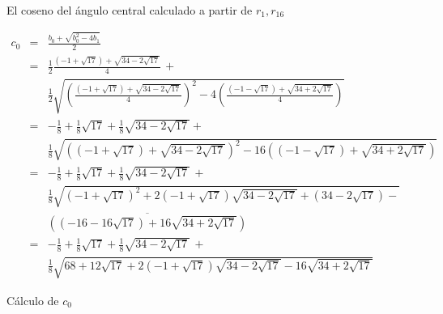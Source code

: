 \begin{figure}[b]
\begin{center}
\end{center}
\caption{El coseno del ángulo central calculado a partir de $r_1,r_{16}$}\label{f.hept-cosine}
\end{figure}

\begin{figure}[t]
\begin{eqnarray*}
c_0&=&\frac{b_0+\sqrt{b_0^2-4b_1}}{2}\\
&=&\frac{1}{2}
     \frac{
     (-1+\sqrt{17}) + 
     \sqrt{34-2\sqrt{17}}
   }{4}\,+ \\
&& 
    \frac{1}{2}
       \sqrt{\left(\frac{
     (-1+\sqrt{17}) + 
     \sqrt{34-2\sqrt{17}}
   }{4}\right)^2-4\left(\frac{
     (-1-\sqrt{17}) + 
     \sqrt{34+2\sqrt{17}}
   }{4}\right)}
   \\
&=&-\frac{1}{8}+\frac{1}{8}\sqrt{17} + 
     \frac{1}{8}\sqrt{34-2\sqrt{17}}
    + \\
   &&
     \frac{1}{8}\sqrt{
     \left(
     (-1+\sqrt{17}) + 
     \sqrt{34-2\sqrt{17}}
   \right)^2-16\left(
     (-1-\sqrt{17}) + 
     \sqrt{34+2\sqrt{17}}
   \right)}
\\
&=&-\frac{1}{8}+\frac{1}{8}\sqrt{17} + 
     \frac{1}{8}\sqrt{34-2\sqrt{17}}
   \, + \\
   &&
     \frac{1}{8}\sqrt{
     (-1+\sqrt{17})^2 + 
     2(-1+\sqrt{17})\sqrt{34-2\sqrt{17}}+
     (34-2\sqrt{17})
   -}\\
   &&\overline{
     \left((-16-16\sqrt{17}) + 
     16\sqrt{34+2\sqrt{17}}\right)
   }
\\
&=&-\frac{1}{8}+\frac{1}{8}\sqrt{17} + 
     \frac{1}{8}\sqrt{34-2\sqrt{17}}
    \,+ \\
   &&
     \frac{1}{8}\sqrt{
     68+12\sqrt{17} + 
     2(-1+\sqrt{17})\sqrt{34-2\sqrt{17}}
   -16
     \sqrt{34+2\sqrt{17}}
   }
\end{eqnarray*}
\caption{Cálculo de $c_0$}\label{fig.c0}
\end{figure}

